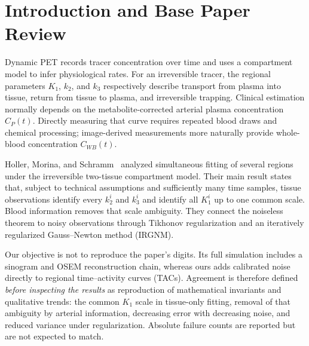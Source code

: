 \documentclass[sigconf,nonacm]{acmart}
\begin{document}


\maketitle

\section{Introduction and Base Paper Review}

Dynamic PET records tracer concentration over time and uses a compartment model to infer physiological rates. For an irreversible tracer, the regional parameters $K_1$, $k_2$, and $k_3$ respectively describe transport from plasma into tissue, return from tissue to plasma, and irreversible trapping. Clinical estimation normally depends on the metabolite-corrected arterial plasma concentration $C_P(t)$. Directly measuring that curve requires repeated blood draws and chemical processing; image-derived measurements more naturally provide whole-blood concentration $C_{WB}(t)$.

Holler, Morina, and Schramm~\cite{holler2024} analyzed simultaneous fitting of several regions under the irreversible two-tissue compartment model. Their main result states that, subject to technical assumptions and sufficiently many time samples, tissue observations identify every $k_2^i$ and $k_3^i$ and identify all $K_1^i$ up to one common scale. Blood information removes that scale ambiguity. They connect the noiseless theorem to noisy observations through Tikhonov regularization and an iteratively regularized Gauss--Newton method (IRGNM).

Our objective is not to reproduce the paper's digits. Its full simulation includes a sinogram and OSEM reconstruction chain, whereas ours adds calibrated noise directly to regional time--activity curves (TACs). Agreement is therefore defined \emph{before inspecting the results} as reproduction of mathematical invariants and qualitative trends: the common $K_1$ scale in tissue-only fitting, removal of that ambiguity by arterial information, decreasing error with decreasing noise, and reduced variance under regularization. Absolute failure counts are reported but are not expected to match.
\end{document}
